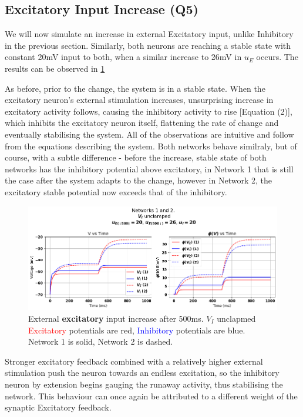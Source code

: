 \documentclass[10pt,twocolumn]{article}
\begin{document}
\subsection{Excitatory Input Increase (Q5)}
We will now simulate an increase in external Excitatory input, unlike Inhibitory
in the previous section. Similarly, both neurons are reaching a stable state
with constant 20mV input to both, when a similar increase to 26mV in $u_E$ occurs.
The results can be observed in \ref{fig:e-input-unclamped}

As before, prior to the change, the system is in a stable state. When the
excitatory neuron's external stimulation increases, unsurprising increase
in excitatory activity follows, causing the inhibitory activity to rise
    [Equation (2)], which inhibits the excitatory neuron itself, flattening
the rate of change and eventually stabilising the system.
All of the observations are intuitive and follow from the equations
describing the system. Both networks behave similraly, but of course,
with a subtle difference - before the increase, stable state of
both networks has the inhibitory potential above excitatory,
in Network 1 that is still the case after the system adapts to the
change, however in Network 2, the excitatory stable potential now
exceeds that of the inhibitory.

\begin{figure}
    \centering
    \captionsetup{justification=centering}
    \includegraphics[width=1\textwidth]{images/12-E_input.png}
    \caption{External \textbf{excitatory} input increase after 500ms. $V_I$ unclapmed \\
        \textcolor{red}{Excitatory} potentials are red, \textcolor{blue}{Inhibitory} potentials are blue.\\
        Network 1 is solid, Network 2 is dashed.}
    \label{fig:e-input-unclamped}
\end{figure}

Stronger excitatory feedback combined with a relatively higher external
stimulation push the neuron towards an endless excitation, so the
inhibitory neuron by extension begins gauging the runaway activity,
thus stabilising the network. This behaviour can once again be
attributed to a different weight of the synaptic Excitatory feedback.
\end{document}
